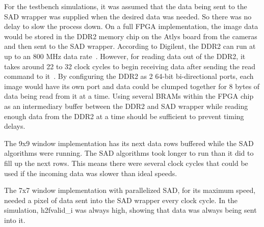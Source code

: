 For the testbench simulations, it was assumed that the data being sent to the SAD wrapper was supplied when the desired data was needed. So there was no delay to slow the process down. On a full FPGA implementation, the image data would be stored in the DDR2 memory chip on the Atlys board from the cameras and then sent to the SAD wrapper. According to Digilent, the DDR2 can run at up to an 800 MHz data rate~\cite{atlysBoard}. However, for reading data out of the DDR2, it takes around 22 to 32 clock cycles to begin receiving data after sending the read command to it~\cite{ug388}. By configuring the DDR2 as 2 64-bit bi-directional ports, each image would have its own port and data could be clumped together for 8 bytes of data being read from it at a time. Using several BRAMs within the FPGA chip as an intermediary buffer between the DDR2 and SAD wrapper while reading enough data from the DDR2 at a time should be sufficient to prevent timing delays.

The 9x9 window implementation has its next data rows buffered while the SAD algorithms were running. The SAD algorithms took longer to run than it did to fill up the next rows. This means there were several clock cycles that could be used if the incoming data was slower than ideal speeds.

The 7x7 window implementation with parallelized SAD, for its maximum speed, needed a pixel of data sent into the SAD wrapper every clock cycle. In the simulation, h2fvalid\_i was always high, showing that data was always being sent into it. 

